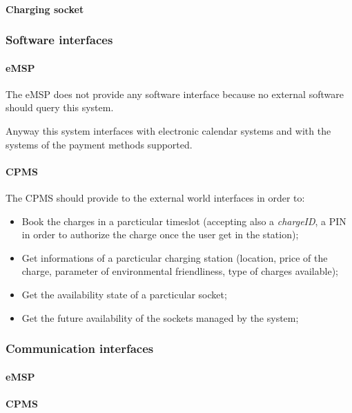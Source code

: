 \paragraph{\ac{Charging socket}}


\subsubsection{Software interfaces}
\paragraph{\ac{eMSP}}
The \ac{eMSP} does not provide any software interface because no external software should query this system.

Anyway this system interfaces with electronic calendar systems and with the systems of the payment methods supported.


\paragraph{\ac{CPMS}}
The \ac{CPMS} should provide to the external world interfaces in order to:
\begin{itemize}
    \item Book the charges in a parcticular timeslot (accepting also a \textit{chargeID}, a PIN in order to authorize the charge once the user get in the station);
    \item Get informations of a parcticular charging station (location, price of the charge, parameter of environmental friendliness, type of charges available);
    \item Get the availability state of a parcticular socket;
    \item Get the future availability of the sockets managed by the system;
\end{itemize}


\subsubsection{Communication interfaces}
\paragraph{\ac{eMSP}}
\paragraph{\ac{CPMS}}

